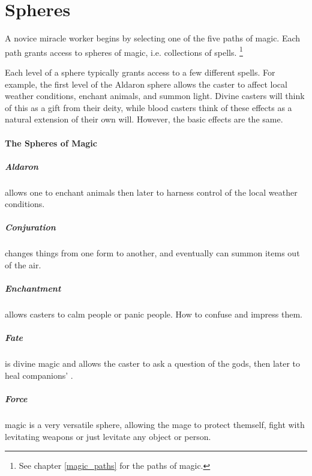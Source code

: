 \chapter{Spheres}

\begin{multicols}{2}

\noindent
A novice miracle worker begins by selecting one of the five paths of magic.
Each path grants access to spheres of magic, i.e. collections of spells.%
\footnote{See chapter \ref{magic_paths} for the paths of magic.}

Each level of a sphere typically grants access to a few different spells.
For example, the first level of the Aldaron sphere allows the caster to affect local weather conditions, enchant animals, and summon light.
Divine casters will think of this as a gift from their deity, while blood casters think of these effects as a natural extension of their own will.
However, the basic effects are the same.

\subsubsection{The Spheres of Magic}

\paragraph{Aldaron} allows one to enchant animals then later to harness control of the local weather conditions.

\paragraph{Conjuration} changes things from one form to another, and eventually can summon items out of the air.

\paragraph{Enchantment} allows casters to calm people or panic people. How to confuse and impress them.

\paragraph{Fate} is divine magic and allows the caster to ask a question of the gods, then later to heal companions' .

\paragraph{Force} magic is a very versatile sphere, allowing the mage to protect themself, fight with levitating weapons or just levitate any object or person.


\end{multicols}
